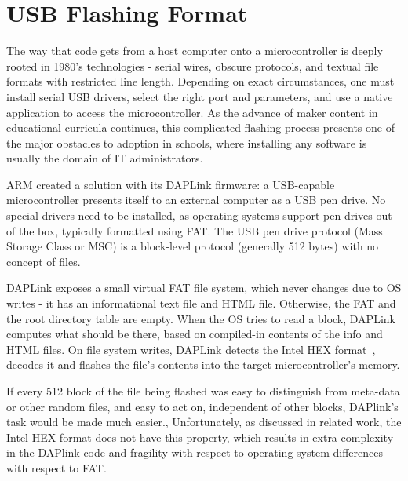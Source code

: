 \section{USB Flashing Format}
\label{sec:uf2}

The way that code gets from a host computer onto a microcontroller is deeply rooted in 1980's technologies - 
serial wires, obscure protocols, and textual file formats with restricted line length. Depending on exact circumstances,
one must install serial USB drivers, select the right port and parameters, and use a native application to access
the microcontroller. As the advance of maker content in educational curricula continues,
this complicated flashing process presents one of the major obstacles to adoption in schools, 
where installing any software is usually the domain of IT administrators.

ARM created a solution with its DAPLink firmware: a USB-capable microcontroller presents itself 
to an external computer as a USB pen drive. No special drivers need to be installed, as operating systems support pen
drives out of the box, typically formatted using FAT. The USB pen drive protocol (Mass Storage Class or MSC) is a
block-level protocol (generally 512 bytes) with no concept of files. 

DAPLink exposes a small virtual FAT file system, which
never changes due to OS writes - it has an informational text file and HTML file. 
Otherwise, the FAT and the root directory table are empty. When the OS tries to read a block,
DAPLink computes what should be there, 
based on compiled-in contents of the info and HTML files.
On file system writes, DAPLink detects the Intel HEX format~\cite{IntelHEX}, 
decodes it and flashes the file's contents into the target microcontroller's memory. 

If every 512 block of the file being flashed was easy to distinguish from meta-data
or other random files, and easy to act on, independent of other blocks, DAPlink's
task would be made much easier., Unfortunately, as discussed in related work, 
the Intel HEX format does not have this property, which results in extra complexity
in the DAPlink code and fragility with respect to operating system differences with
respect to FAT. 

%

